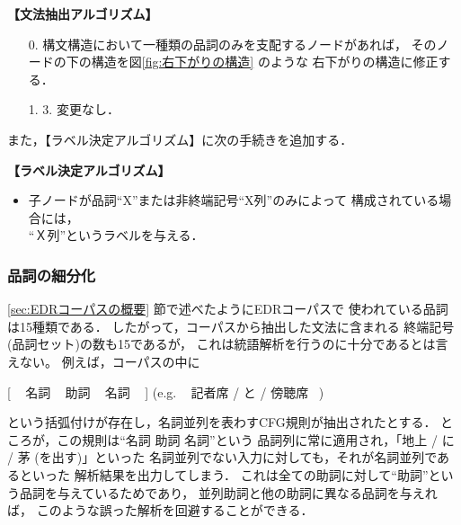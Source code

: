 \newpage
\begin{flushleft}
  {\bf 【文法抽出アルゴリズム】}
  \vspace*{-3mm}
\end{flushleft}

\begin{itemize}
\item[0.]
  構文構造において一種類の品詞のみを支配するノードがあれば，
  そのノードの下の構造を図\ref{fig:右下がりの構造} のような
  右下がりの構造に修正する．

\item[1.]  3. \hspace{5mm} 変更なし．
\end{itemize}

\bigskip
\noindent
また，【ラベル決定アルゴリズム】に次の手続きを追加する．
\begin{flushleft}
  {\bf 【ラベル決定アルゴリズム】}
  \vspace*{-3mm}
\end{flushleft}

\begin{itemize}
\item
  子ノードが品詞``X''または非終端記号``X列''のみによって
  構成されている場合には，\\
  ``Ｘ列''というラベルを与える．
\end{itemize}

\subsubsection{品詞の細分化}
\label{sec:品詞の細分化}

\ref{sec:EDRコーパスの概要} 節で述べたようにEDRコーパスで
使われている品詞は15種類である．
したがって，コーパスから抽出した文法に含まれる
終端記号(品詞セット)の数も15であるが，
これは統語解析を行うのに十分であるとは言えない。
例えば，コーパスの中に
\begin{center}
  [ ~ 名詞 ~ 助詞 ~ 名詞 ~ ] \qquad (e.g. ~ 記者席 / と / 傍聴席 ~)
\end{center}
という括弧付けが存在し，名詞並列を表わすCFG規則が抽出されたとする．
ところが，この規則は``名詞 助詞 名詞''という
品詞列に常に適用され，「地上 / に / 茅 (を出す)」といった
名詞並列でない入力に対しても，それが名詞並列であるといった
解析結果を出力してしまう．
これは全ての助詞に対して``助詞''という品詞を与えているためであり，
並列助詞と他の助詞に異なる品詞を与えれば，
このような誤った解析を回避することができる．

